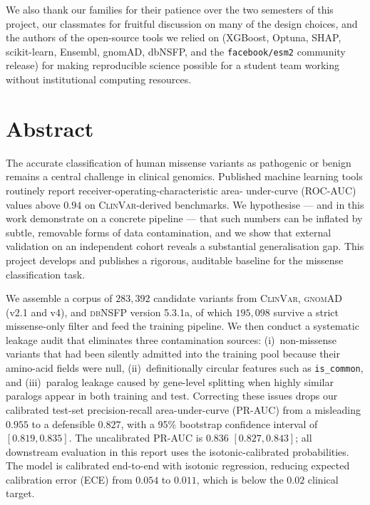 \documentclass[11pt,a4paper,oneside]{report}
\begin{document}
We also thank our families for their patience over the two semesters of
this project, our classmates for fruitful discussion on many of the
design choices, and the authors of the open-source tools we relied on
(XGBoost, Optuna, SHAP, scikit-learn, Ensembl, gnomAD, dbNSFP, and the
\texttt{facebook/esm2} community release) for making reproducible science
possible for a student team working without institutional computing
resources.
\clearpage

\chapter*{Abstract}
The accurate classification of human missense variants as pathogenic or
benign remains a central challenge in clinical genomics. Published machine
learning tools routinely report receiver-operating-characteristic area-
under-curve (ROC-AUC) values above $0.94$ on \textsc{ClinVar}-derived
benchmarks. We hypothesise --- and in this work demonstrate on a concrete
pipeline --- that such numbers can be inflated by subtle, removable forms
of data contamination, and we show that external validation on an
independent cohort reveals a substantial generalisation gap. This project
develops and publishes a rigorous, auditable baseline for the missense
classification task.

We assemble a corpus of $283{,}392$ candidate variants from \textsc{ClinVar},
\textsc{gnomAD} (v2.1 and v4), and \textsc{dbNSFP} version 5.3.1a, of which
$195{,}098$ survive a strict missense-only filter and feed the training
pipeline. We then conduct a systematic leakage audit that eliminates
three contamination sources: (i)~non-missense variants that had been silently admitted into
the training pool because their amino-acid fields were null,
(ii)~definitionally circular features such as \texttt{is\_common}, and
(iii)~paralog leakage caused by gene-level splitting when highly similar
paralogs appear in both training and test. Correcting these issues drops
our calibrated test-set precision-recall area-under-curve (PR-AUC) from a
misleading $0.955$ to a defensible $0.827$, with a 95\% bootstrap confidence
interval of $[0.819, 0.835]$. The uncalibrated PR-AUC is $0.836$
$[0.827, 0.843]$; all downstream evaluation in this report uses the
isotonic-calibrated probabilities. The model is calibrated end-to-end with
isotonic regression, reducing expected calibration error (ECE) from
$0.054$ to $0.011$, which is below the $0.02$ clinical target.
\end{document}
